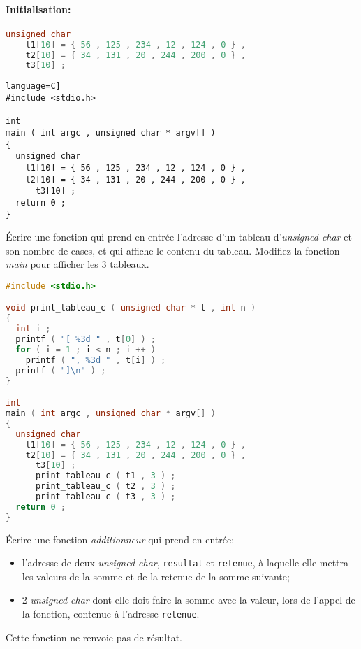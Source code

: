\paragraph{Initialisation:} 
\begin{lstlisting}[language=C]
unsigned char
    t1[10] = { 56 , 125 , 234 , 12 , 124 , 0 } ,
    t2[10] = { 34 , 131 , 20 , 244 , 200 , 0 } ,
    t3[10] ;
\end{lstlisting}
\begin{solutioncachee}
  \begin{lstlisting}language=C]
#include <stdio.h>

int
main ( int argc , unsigned char * argv[] )
{
  unsigned char
    t1[10] = { 56 , 125 , 234 , 12 , 124 , 0 } ,
    t2[10] = { 34 , 131 , 20 , 244 , 200 , 0 } ,
      t3[10] ;
  return 0 ;
}
  \end{lstlisting}
\end{solutioncachee}

\question Écrire une fonction qui prend en entrée l'adresse d'un tableau d'\emph{unsigned char} et son nombre de cases, et qui affiche le contenu du tableau. Modifiez la fonction 
\emph{main} pour afficher les 3 tableaux.
\begin{solutioncachee}
  \begin{lstlisting}[language=C]
#include <stdio.h>

void print_tableau_c ( unsigned char * t , int n )
{
  int i ;
  printf ( "[ %3d " , t[0] ) ;
  for ( i = 1 ; i < n ; i ++ )
    printf ( ", %3d " , t[i] ) ;
  printf ( "]\n" ) ;
}

int
main ( int argc , unsigned char * argv[] )
{
  unsigned char
    t1[10] = { 56 , 125 , 234 , 12 , 124 , 0 } ,
    t2[10] = { 34 , 131 , 20 , 244 , 200 , 0 } ,
      t3[10] ;
      print_tableau_c ( t1 , 3 ) ;
      print_tableau_c ( t2 , 3 ) ;
      print_tableau_c ( t3 , 3 ) ;
  return 0 ;
}    
  \end{lstlisting}
\end{solutioncachee}

\question Écrire une fonction \emph{additionneur} qui prend en entrée:
\begin{itemize}
\item l'adresse de deux \emph{unsigned char}, \texttt{resultat} et
  \texttt{retenue}, à laquelle elle mettra les valeurs de la somme et
  de la retenue de la somme suivante;
\item 2 \emph{unsigned char} dont elle doit faire la somme avec la valeur, lors
  de l'appel de la fonction, contenue à l'adresse \texttt{retenue}.
\end{itemize}
Cette fonction ne renvoie pas de résultat.

